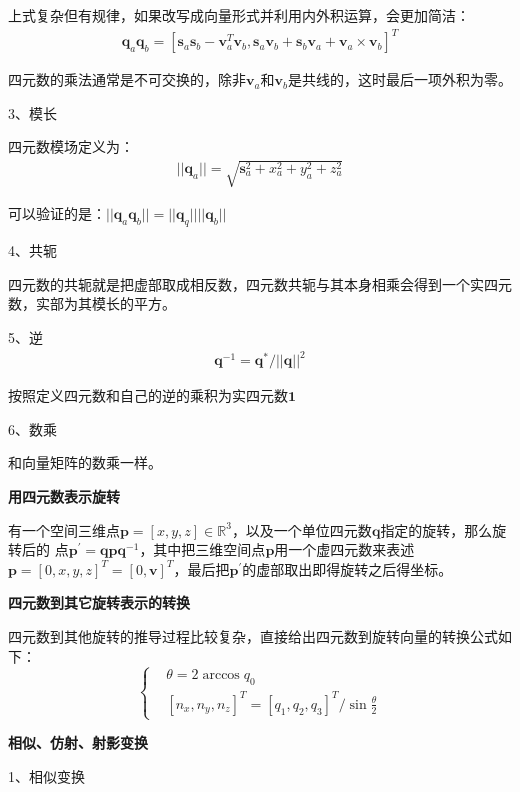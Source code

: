 \documentclass[10pt]{article}
\begin{document}
上式复杂但有规律，如果改写成向量形式并利用内外积运算，会更加简洁：
\begin{align} 
    \mathbf{q}_a\mathbf{q}_b=[\mathbf{s}_a\mathbf{s}_b-\mathbf{v}_a^T\mathbf{v}_b,\mathbf{s}_a\mathbf{v}_b+
    \mathbf{s}_b\mathbf{v}_a+\mathbf{v}_a \times \mathbf{v}_b]^T
\end{align}

四元数的乘法通常是不可交换的，除非$\mathbf{v}_a$和$\mathbf{v}_b$是共线的，这时最后一项外积为零。

3、模长

四元数模场定义为：
\begin{align} 
    ||\mathbf{q}_a|| = \sqrt{\mathbf{s}_a^2+x_a^2+y_a^2+z_a^2}
\end{align}

可以验证的是：$||\mathbf{q}_a\mathbf{q}_b|| = ||\mathbf{q}_q||||\mathbf{q}_b||$

4、共轭

四元数的共轭就是把虚部取成相反数，四元数共轭与其本身相乘会得到一个实四元数，实部为其模长的平方。

5、逆
\begin{align} 
    \mathbf{q}^{-1}=\mathbf{q}^{*}/||\mathbf{q}||^{2}
\end{align}

按照定义四元数和自己的逆的乘积为实四元数$\mathbf{1}$

6、数乘

 和向量矩阵的数乘一样。

 \textbf{用四元数表示旋转}

有一个空间三维点$\mathbf{p}=[x,y,z]\in \mathbb{R}^{3}$，以及一个单位四元数$\mathbf{q}$指定的旋转，那么旋转后的
点$\mathbf{p}^{'}=\mathbf{qp}\mathbf{q}^{-1}$，其中把三维空间点$\mathbf{p}$用一个虚四元数来表述$\mathbf{p}=
[0,x,y,z]^{T}=[0,\mathbf{v}]^{T}$，最后把$\mathbf{p}^{'}$的虚部取出即得旋转之后得坐标。
 
\textbf{四元数到其它旋转表示的转换}

四元数到其他旋转的推导过程比较复杂，直接给出四元数到旋转向量的转换公式如下：
\begin{equation} 
    \left\{
\begin{aligned}
    &\theta=2\arccos q_0 \\ 
    &[n_x,n_y,n_z]^{T}=[q_1,q_2,q_3]^{T}/ \sin{\frac{\theta}{2}}
\end{aligned}
    \right.
\end{equation}

\textbf{相似、仿射、射影变换}

1、相似变换
\end{document}

